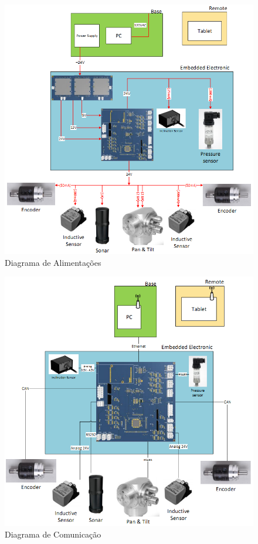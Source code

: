 \begin{figure}[H]
\centering
\includegraphics[width=1\columnwidth]{figs/eletronica/alimv1.png}
\caption{Diagrama de Alimentações}
\label{alimentacao_placa}
\end{figure}

\begin{figure}[H]
\centering
\includegraphics[width=1\columnwidth]{figs/eletronica/comv1.png}
\caption{Diagrama de Comunicação}
\label{com_placa}
\end{figure}

